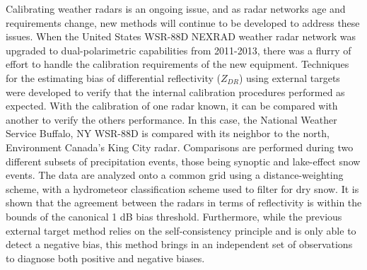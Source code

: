 Calibrating weather radars is an ongoing issue, and as radar networks age and requirements change, new methods will continue to be developed to address these issues. When the United States WSR-88D NEXRAD weather radar network was upgraded to dual-polarimetric capabilities from 2011-2013, there was a flurry of effort to handle the calibration requirements of the new equipment. Techniques for the estimating bias of differential reflectivity ($Z_{DR}$) using external targets were developed to verify that the internal calibration procedures performed as expected. With the calibration of one radar known, it can be compared with another to verify the others performance. In this case, the National Weather Service Buffalo, NY WSR-88D is compared with its neighbor to the north, Environment Canada's King City radar. Comparisons are performed during two different subsets of precipitation events, those being synoptic and lake-effect snow events. The data are analyzed onto a common grid using a distance-weighting scheme, with a hydrometeor classification scheme used to filter for dry snow. It is shown that the agreement between the radars in terms of reflectivity is within the bounds of the canonical 1 dB bias threshold. Furthermore, while the previous  external target method relies on the self-consistency principle and is only able to detect a negative bias, this method brings in an independent set of observations to diagnose both positive and negative biases. 